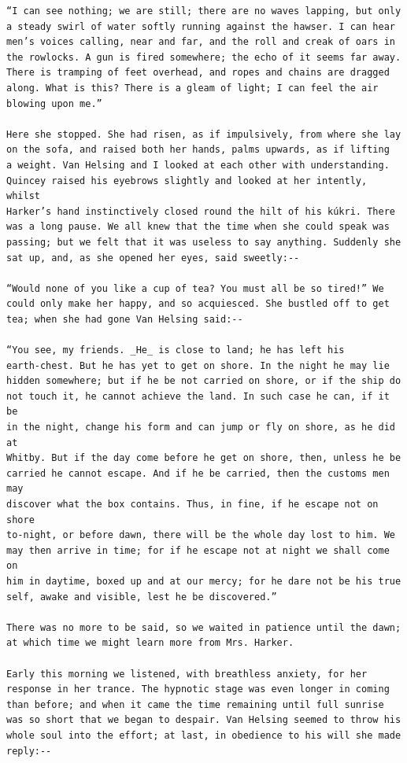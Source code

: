 \documentclass{article}
\begin{document}
\begin{verbatim}
“I can see nothing; we are still; there are no waves lapping, but only
a steady swirl of water softly running against the hawser. I can hear
men’s voices calling, near and far, and the roll and creak of oars in
the rowlocks. A gun is fired somewhere; the echo of it seems far away.
There is tramping of feet overhead, and ropes and chains are dragged
along. What is this? There is a gleam of light; I can feel the air
blowing upon me.”

Here she stopped. She had risen, as if impulsively, from where she lay
on the sofa, and raised both her hands, palms upwards, as if lifting
a weight. Van Helsing and I looked at each other with understanding.
Quincey raised his eyebrows slightly and looked at her intently, whilst
Harker’s hand instinctively closed round the hilt of his kúkri. There
was a long pause. We all knew that the time when she could speak was
passing; but we felt that it was useless to say anything. Suddenly she
sat up, and, as she opened her eyes, said sweetly:--

“Would none of you like a cup of tea? You must all be so tired!” We
could only make her happy, and so acquiesced. She bustled off to get
tea; when she had gone Van Helsing said:--

“You see, my friends. _He_ is close to land; he has left his
earth-chest. But he has yet to get on shore. In the night he may lie
hidden somewhere; but if he be not carried on shore, or if the ship do
not touch it, he cannot achieve the land. In such case he can, if it be
in the night, change his form and can jump or fly on shore, as he did at
Whitby. But if the day come before he get on shore, then, unless he be
carried he cannot escape. And if he be carried, then the customs men may
discover what the box contains. Thus, in fine, if he escape not on shore
to-night, or before dawn, there will be the whole day lost to him. We
may then arrive in time; for if he escape not at night we shall come on
him in daytime, boxed up and at our mercy; for he dare not be his true
self, awake and visible, lest he be discovered.”

There was no more to be said, so we waited in patience until the dawn;
at which time we might learn more from Mrs. Harker.

Early this morning we listened, with breathless anxiety, for her
response in her trance. The hypnotic stage was even longer in coming
than before; and when it came the time remaining until full sunrise
was so short that we began to despair. Van Helsing seemed to throw his
whole soul into the effort; at last, in obedience to his will she made
reply:--


\end{verbatim}
\end{document}
